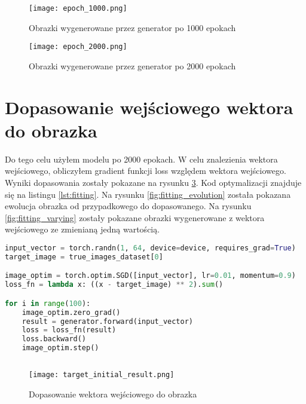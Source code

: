 \documentclass[a4paper]{article}
\begin{document}
\begin{figure}[H]
    \centering
    \texttt{[image: epoch\_1000.png]}
    \caption{Obrazki wygenerowane przez generator po 1000 epokach}
    \label{fig:1000}
\end{figure}

\begin{figure}[H]
    \centering
    \texttt{[image: epoch\_2000.png]}
    \caption{Obrazki wygenerowane przez generator po 2000 epokach}
    \label{fig:2000}
\end{figure}

\section{Dopasowanie wejściowego wektora do obrazka}

Do tego celu użyłem modelu po 2000 epokach. W celu znalezienia wektora
wejściowego, obliczyłem gradient funkcji loss względem wektora wejściowego.
Wyniki dopasowania zostały pokazane na rysunku \ref{fig:fitting}.
Kod optymalizacji znajduje się na listingu \ref{lst:fitting}. Na rysunku
\ref{fig:fitting_evolution} została pokazana ewolucja obrazka od przypadkowego
do dopasowanego. Na rysunku \ref{fig:fitting_varying} zostały pokazane obrazki
wygenerowane z wektora wejściowego ze zmienianą jedną wartością.



\begin{lstlisting}[language=python,caption={Dopasowanie wektora wejściowego do obrazka},label={lst:fitting}]
input_vector = torch.randn(1, 64, device=device, requires_grad=True)
target_image = true_images_dataset[0]

image_optim = torch.optim.SGD([input_vector], lr=0.01, momentum=0.9)
loss_fn = lambda x: ((x - target_image) ** 2).sum()

for i in range(100):
    image_optim.zero_grad()
    result = generator.forward(input_vector)
    loss = loss_fn(result)
    loss.backward()
    image_optim.step()
    
\end{lstlisting}

\begin{figure}[H]
    \centering
    \texttt{[image: target\_initial\_result.png]}
    \caption{Dopasowanie wektora wejściowego do obrazka}
    \label{fig:fitting}
\end{figure}
\end{document}
